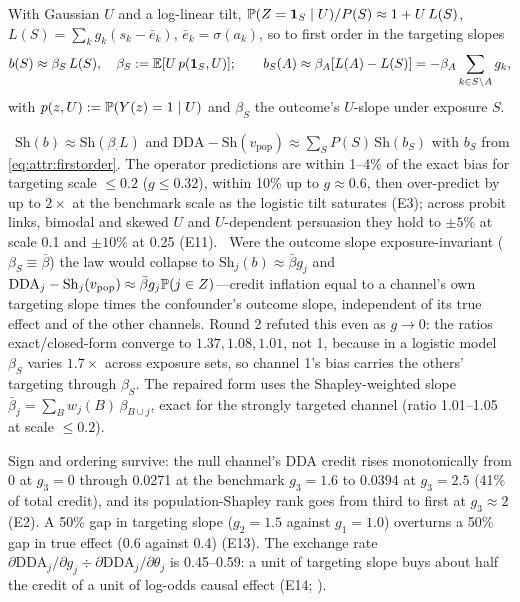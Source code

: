 With Gaussian $U$ and a log-linear tilt, $\mathbb{P}(Z = \mathbf{1}_S \mid U)/P(S) \approx 1 + U\,L(S)$, $L(S) = \sum_k g_k(s_k - \bar e_k)$, $\bar e_k = \sigma(a_k)$, so to first order in the targeting slopes
\begin{equation}
b(S) \approx \beta_S\,L(S), \quad \beta_S := \mathbb{E}[U\,p(\mathbf{1}_S, U)]; \qquad b_S(A) \approx \beta_A[L(A) - L(S)] = -\beta_A \sum_{k \in S \setminus A} g_k,
\label{eq:attr:firstorder}
\end{equation}
with $p(z, U) := \mathbb{P}(Y(z) = 1 \mid U)$ and $\beta_S$ the outcome's $U$-slope under exposure $S$.

\begin{law}
\label{attr:law:operator}
\tagNumerical\ $\mathrm{Sh}(b) \approx \mathrm{Sh}(\beta_\cdot L)$ and $\mathrm{DDA} - \mathrm{Sh}(v_{\mathrm{pop}}) \approx \sum_S P(S)\,\mathrm{Sh}(b_S)$ with $b_S$ from \cref{eq:attr:firstorder}. The operator predictions are within 1--4\% of the exact bias for targeting scale $\le 0.2$ ($g \le 0.32$), within 10\% up to $g \approx 0.6$, then over-predict by up to $2\times$ at the benchmark scale as the logistic tilt saturates (E3); across probit links, bimodal and skewed $U$ and $U$-dependent persuasion they hold to $\pm5\%$ at scale 0.1 and $\pm10\%$ at 0.25 (E11). \tagRefuted\ Were the outcome slope exposure-invariant ($\beta_S \equiv \bar\beta$) the law would collapse to $\mathrm{Sh}_j(b) \approx \bar\beta g_j$ and $\mathrm{DDA}_j - \mathrm{Sh}_j(v_{\mathrm{pop}}) \approx \bar\beta g_j \mathbb{P}(j \in Z)$---credit inflation equal to a channel's own targeting slope times the confounder's outcome slope, independent of its true effect and of the other channels. Round 2 refuted this even as $g \to 0$: the ratios exact/closed-form converge to $1.37, 1.08, 1.01$, not 1, because in a logistic model $\beta_S$ varies $1.7\times$ across exposure sets, so channel 1's bias carries the others' targeting through $\beta_S$. The repaired form uses the Shapley-weighted slope $\bar\beta_j = \sum_B w_j(B)\,\beta_{B \cup j}$, exact for the strongly targeted channel (ratio 1.01--1.05 at scale $\le 0.2$).
\end{law}

Sign and ordering survive: the null channel's DDA credit rises monotonically from 0 at $g_3 = 0$ through 0.0271 at the benchmark $g_3 = 1.6$ to 0.0394 at $g_3 = 2.5$ (41\% of total credit), and its population-Shapley rank goes from third to first at $g_3 \approx 2$ (E2). A 50\% gap in targeting slope ($g_2 = 1.5$ against $g_1 = 1.0$) overturns a 50\% gap in true effect (0.6 against 0.4) (E13). The exchange rate $\partial\mathrm{DDA}_j/\partial g_j \div \partial\mathrm{DDA}_j/\partial\theta_j$ is 0.45--0.59: a unit of targeting slope buys about half the credit of a unit of log-odds causal effect (E14; ).

